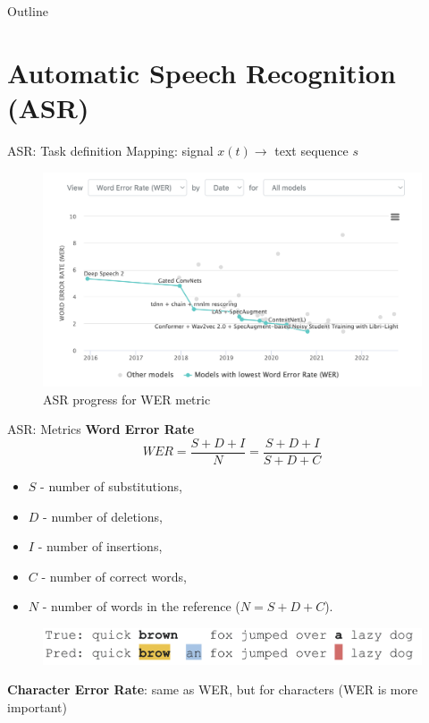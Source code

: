 
\usepackage{tikz}
\usetikzlibrary{arrows,shapes,positioning,shadows,trees}

\begin{frame}
\titlepage
\end{frame}
\begin{frame}{Outline}
	\tableofcontents
\end{frame}
\section{Automatic Speech Recognition (ASR)}
\begin{frame}{ASR: Task definition}
    Mapping: signal $x(t) \rightarrow$ text sequence $s$ 
    \begin{figure}
    	\centering
    	\includegraphics[width=0.99\linewidth]{figs/asr.png}
    	\caption{ASR progress for WER metric}
    \end{figure}
\end{frame}
\begin{frame}{ASR: Metrics}
    \textbf{Word Error Rate} $$WER=\frac{S+D+I}{N}=\frac{S+D+I}{S+D+C}$$
    \begin{itemize}
        \item $S$ - number of substitutions,
        \item $D$ - number of deletions,
        \item $I$ - number of insertions,
        \item $C$ - number of correct words,
        \item $N$ - number of words in the reference ($N=S+D+C$).
    \end{itemize}
    \begin{figure}
    	\centering
    	\includegraphics[width=0.99\linewidth]{figs/wer.png}
    \end{figure}

    \textbf{Character Error Rate}: same as WER, but for characters (WER is more important)
\end{frame}
